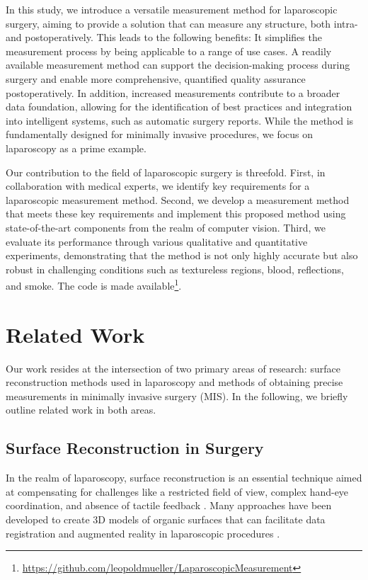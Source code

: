 \documentclass[letterpaper]{article} %
\begin{document}
In this study, we introduce a versatile measurement method for laparoscopic surgery, aiming to provide a solution that can measure any structure, both intra- and postoperatively. This leads to the following benefits: It simplifies the measurement process by being applicable to a range of use cases. A readily available measurement method can support the decision-making process during surgery and enable more comprehensive, quantified quality assurance postoperatively. In addition, increased measurements contribute to a broader data foundation, allowing for the identification of best practices and integration into intelligent systems, such as automatic surgery reports. While the method is fundamentally designed for minimally invasive procedures, we focus on laparoscopy as a prime example.

Our contribution to the field of laparoscopic surgery is threefold. First, in collaboration with medical experts, we identify key requirements for a laparoscopic measurement method. Second, we develop a measurement method that meets these key requirements and implement this proposed method using state-of-the-art components from the realm of computer vision. Third, we evaluate its performance through various qualitative and quantitative experiments, demonstrating that the method is not only highly accurate but also robust in challenging conditions such as textureless regions, blood, reflections, and smoke. The code is made available\footnote{\url{https://github.com/leopoldmueller/LaparoscopicMeasurement}}.

\section{Related Work}

Our work resides at the intersection of two primary areas of research: surface reconstruction methods used in laparoscopy and methods of obtaining precise measurements in minimally invasive surgery (MIS). In the following, we briefly outline related work in both areas.

\subsection{Surface Reconstruction in Surgery}

In the realm of laparoscopy, surface reconstruction is an essential technique aimed at compensating for challenges like a restricted field of view, complex hand-eye coordination, and absence of tactile feedback \cite{maier-hein_comparative_2014}. Many approaches have been developed to create 3D models of organic surfaces that can facilitate data registration and augmented reality in laparoscopic procedures \cite{rohl_dense_2012, maier-hein_comparative_2014}.
\end{document}
